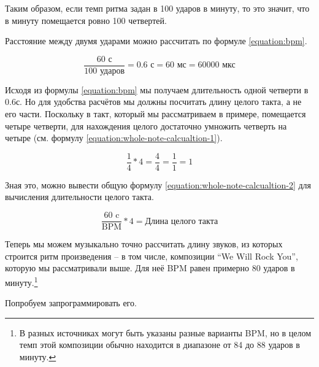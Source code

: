 \documentclass[../sparc.tex]{subfiles}
\begin{document}
Таким образом, если темп ритма задан в 100 ударов в минуту, то это значит, что в
минуту помещается ровно 100 четвертей.


Расстояние между двумя ударами можно рассчитать по формуле \ref{equation:bpm}.

\begin{equation}
  \frac{\mbox{60 с}}{\mbox{100 ударов}} = \mbox{0.6 с} = \mbox{60 мс} = \mbox{60000 мкс}
  \label{equation:bpm}
\end{equation}

Исходя из формулы \ref{equation:bpm} мы получаем длительность одной четверти в
0.6с. Но для удобства расчётов мы должны посчитать длину целого такта, а не его
части. Поскольку в такт, который мы рассматриваем в примере, помещается четыре
четверти, для нахождения целого достаточно умножить четверть на четыре (см.
формулу \ref{equation:whole-note-calcualtion-1}).

\begin{equation}
  \frac{1}{4} * 4 = \frac{4}{4} = \frac{1}{1} = 1
  \label{equation:whole-note-calcualtion-1}
\end{equation}

Зная это, можно вывести общую формулу \ref{equation:whole-note-calcualtion-2}
для вычисления длительности целого такта.

\begin{equation}
  \frac{\mbox{60 c}}{\mbox{BPM}} * 4 = \mbox{Длина целого такта}
  \label{equation:whole-note-calcualtion-2}
\end{equation}

Теперь мы можем музыкально точно рассчитать длину звуков, из которых строится
ритм произведения -- в том числе, композиции ``We Will Rock You'', которую мы
рассматривали выше. Для неё BPM равен примерно 80 ударов в минуту.\footnote{В
разных источниках могут быть указаны разные варианты BPM, но в целом темп этой
композиции обычно находится в диапазоне от 84 до 88 ударов в минуту.}

Попробуем запрограммировать его.
\end{document}
